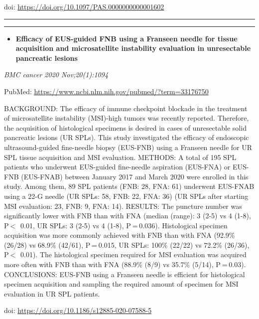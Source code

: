 \documentclass[
]{article}
\providecommand{\tightlist}{%
  \setlength{\itemsep}{0pt}\setlength{\parskip}{0pt}}
\begin{document}
doi: \url{https://doi.org/10.1097/PAS.0000000000001602}

\begin{center}\rule{0.5\linewidth}{0.5pt}\end{center}

\begin{center}\rule{0.5\linewidth}{0.5pt}\end{center}

\begin{itemize}
\tightlist
\item
  \textbf{Efficacy of EUS-guided FNB using a Franseen needle for tissue
  acquisition and microsatellite instability evaluation in unresectable
  pancreatic lesions}
\end{itemize}

\emph{BMC cancer 2020 Nov;20(1):1094}

PubMed: \url{https://www.ncbi.nlm.nih.gov/pubmed/?term=33176750}

BACKGROUND: The efficacy of immune checkpoint blockade in the treatment
of microsatellite instability (MSI)-high tumors was recently reported.
Therefore, the acquisition of histological specimens is desired in cases
of unresectable solid pancreatic lesions (UR SPLs). This study
investigated the efficacy of endoscopic ultrasound-guided fine-needle
biopsy (EUS-FNB) using a Franseen needle for UR SPL tissue acquisition
and MSI evaluation. METHODS: A total of 195 SPL patients who underwent
EUS-guided fine-needle aspiration (EUS-FNA) or EUS-FNB (EUS-FNAB)
between January 2017 and March 2020 were enrolled in this study. Among
them, 89 SPL patients (FNB: 28, FNA: 61) underwent EUS-FNAB using a 22-G
needle (UR SPLs: 58, FNB: 22, FNA: 36) (UR SPLs after starting MSI
evaluation: 23, FNB: 9, FNA: 14). RESULTS: The puncture number was
significantly lower with FNB than with FNA (median (range): 3 (2-5) vs 4
(1-8), P \textless{} ~0.01, UR SPLs: 3 (2-5) vs 4 (1-8), P = 0.036).
Histological specimen acquisition was more commonly achieved with FNB
than with FNA (92.9\% (26/28) vs 68.9\% (42/61), P = 0.015, UR SPLs:
100\% (22/22) vs 72.2\% (26/36), P \textless{} ~0.01). The histological
specimen required for MSI evaluation was acquired more often with FNB
than with FNA (88.9\% (8/9) vs 35.7\% (5/14), P = 0.03). CONCLUSIONS:
EUS-FNB using a Franseen needle is efficient for histological specimen
acquisition and sampling the required amount of specimen for MSI
evaluation in UR SPL patients.

doi: \url{https://doi.org/10.1186/s12885-020-07588-5}
\end{document}
